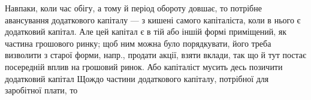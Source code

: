 Навпаки, коли час обігу, а тому й період обороту довшає, то потрібне
авансування додаткового капіталу — з кишені самого капіталіста,
коли в нього є додатковий капітал. Але цей капітал є в тій
або іншій формі приміщений, як частина грошового ринку; щоб ним
можна було порядкувати, його треба визволити з старої форми, напр.,
продати акції, взяти вклади, так що й тут постає посередній вплив на
грошовий ринок. Або капіталіст мусить десь позичити додатковий капітал
Щождо частини додаткового капіталу, потрібної для заробітної плати, то
\parbreak{}  %
